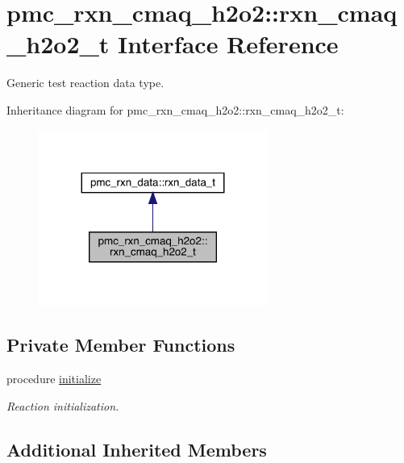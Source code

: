 \hypertarget{structpmc__rxn__cmaq__h2o2_1_1rxn__cmaq__h2o2__t}{}\section{pmc\+\_\+rxn\+\_\+cmaq\+\_\+h2o2\+:\+:rxn\+\_\+cmaq\+\_\+h2o2\+\_\+t Interface Reference}
\label{structpmc__rxn__cmaq__h2o2_1_1rxn__cmaq__h2o2__t}


Generic test reaction data type.  




Inheritance diagram for pmc\+\_\+rxn\+\_\+cmaq\+\_\+h2o2\+:\+:rxn\+\_\+cmaq\+\_\+h2o2\+\_\+t\+:\nopagebreak
\begin{figure}[H]
\begin{center}
\leavevmode
\includegraphics[width=212pt]{structpmc__rxn__cmaq__h2o2_1_1rxn__cmaq__h2o2__t__inherit__graph}
\end{center}
\end{figure}
\subsection*{Private Member Functions}
\begin{DoxyCompactItemize}
\item 
procedure \mbox{\hyperlink{structpmc__rxn__cmaq__h2o2_1_1rxn__cmaq__h2o2__t_ac766648dfe3890768a3f8f786d49eceb}{initialize}}
\begin{DoxyCompactList}\small\item\em Reaction initialization. \end{DoxyCompactList}\end{DoxyCompactItemize}
\subsection*{Additional Inherited Members}


